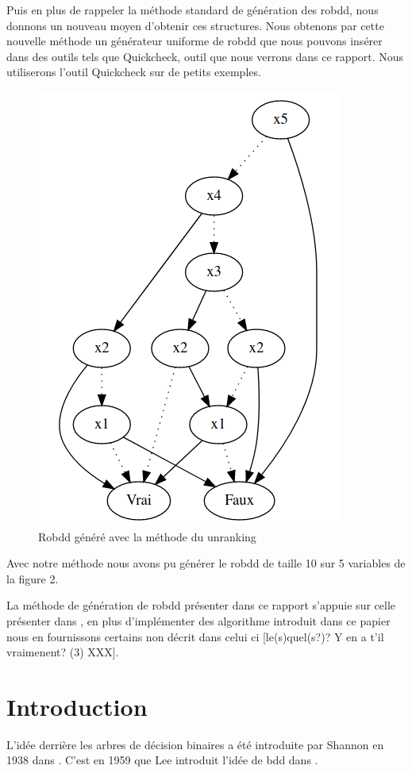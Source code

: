 \documentclass[french]{article}
\begin{document}
Puis en plus de rappeler la méthode standard de génération des robdd, nous donnons un nouveau moyen d'obtenir ces structures. Nous obtenons par cette nouvelle méthode un générateur uniforme de robdd que nous pouvons insérer dans des outils tels que Quickcheck, outil que nous verrons dans ce rapport. Nous utiliserons l'outil Quickcheck sur de petits exemples.

\begin{figure}[h!]
    \centering
    \includegraphics[scale=0.4]{robdd de presentation.png}
    \caption{Robdd généré avec la méthode du unranking}
    \label{fig:ROBDD1}
\end{figure}
\newpage
 Avec notre méthode nous avons pu générer le robdd de taille 10 sur 5 variables de la figure 2.
 
 La méthode de génération de robdd présenter dans ce rapport s'appuie sur celle présenter dans \cite{genitrini}, en plus d'implémenter des algorithme introduit dans ce papier nous en fournissons certains non décrit dans celui ci [le(s)quel(s?)? Y en a t'il vraimenent? (3) XXX].



\section{Introduction}
L'idée derrière les arbres de décision binaires a été introduite par Shannon en 1938 dans \cite{shannon}. C'est en 1959 que Lee introduit l'idée de bdd dans \cite{lee}.
\end{document}
